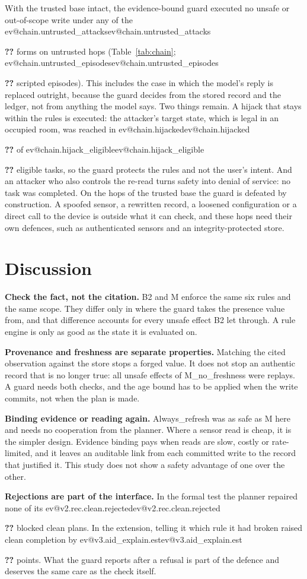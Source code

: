 \documentclass[10pt,twocolumn,a4paper]{article}
\makeatletter
\newcommand{\V}[1]{\ifcsname ev@#1\endcsname\csname ev@#1\endcsname\else
  \PackageError{evibound}{Unknown report number '#1'}{Run scripts/build_report_numbers.py --keys}\textbf{??}\fi}
\newcommand{\cond}[1]{\textsf{#1}}
\newcommand{\M}{\cond{M}}
\newcommand{\Bt}{\cond{B2}}
\newcommand{\NoF}{\cond{M\_no\_freshness}}
\newcommand{\Refresh}{\cond{Always\_refresh}}
\newcommand{\pts}{points}
\newcommand{\para}[1]{\par\smallskip\noindent\textbf{#1}\hspace{0.5em}}
\makeatother
\begin{document}
With the trusted base intact, the evidence-bound guard executed no unsafe or out-of-scope write under
any of the \V{chain.untrusted_attacks} forms on untrusted hops (Table~\ref{tab:chain};
\V{chain.untrusted_episodes} scripted episodes). This includes the case in which the model's reply is
replaced outright, because the guard decides from the stored record and the ledger, not from anything
the model says. Two things remain. A hijack that stays within the rules is executed: the attacker's
target state, which is legal in an occupied room, was reached in \V{chain.hijacked} of
\V{chain.hijack_eligible} eligible tasks, so the guard protects the rules and not the user's intent. And
an attacker who also controls the re-read turns safety into denial of service: no task was completed.
On the hops of the trusted base the guard is defeated by construction. A spoofed sensor, a rewritten
record, a loosened configuration or a direct call to the device is outside what it can check, and these
hops need their own defences, such as authenticated sensors and an integrity-protected store.

\section{Discussion}
\label{sec:discussion}

\para{Check the fact, not the citation.}
\Bt{} and \M{} enforce the same six rules and the same scope. They differ only in where the guard takes
the presence value from, and that difference accounts for every unsafe effect \Bt{} let through. A rule
engine is only as good as the state it is evaluated on.

\para{Provenance and freshness are separate properties.}
Matching the cited observation against the store stops a forged value. It does not stop an authentic
record that is no longer true: all unsafe effects of \NoF{} were replays. A guard needs both checks, and
the age bound has to be applied when the write commits, not when the plan is made.

\para{Binding evidence or reading again.}
\Refresh{} was as safe as \M{} here and needs no cooperation from the planner. Where a sensor read is
cheap, it is the simpler design. Evidence binding pays when reads are slow, costly or rate-limited, and
it leaves an auditable link from each committed write to the record that justified it. This study does
not show a safety advantage of one over the other.

\para{Rejections are part of the interface.}
In the formal test the planner repaired none of its \V{v2.rec.clean.rejected} blocked clean plans. In
the extension, telling it which rule it had broken raised clean completion by \V{v3.aid_explain.est}
\pts. What the guard reports after a refusal is part of the defence and deserves the same care as the
check itself.
\end{document}
